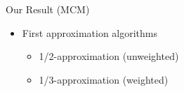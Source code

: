 \begin{frame}{Our Result (MCM)}
\begin{itemize}
  	\item<+-> First approximation algorithms
	\begin{itemize}
	  \item<+> 1/2-approximation (unweighted)
	  \item<+> 1/3-approximation (weighted)
	\end{itemize} 
\end{itemize}
\end{frame}